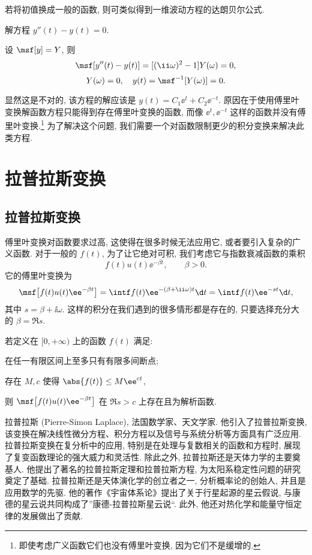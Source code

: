 若将初值换成一般的函数, 则可类似得到一维波动方程的达朗贝尔公式.

\begin{example}
  \label{exam:second-ode}
  解方程 $y''(t)-y(t)=0$.
\end{example}

\begin{solution}
  设 $\msf[y]=Y$, 则
  \[
    \msf[y''(t)-y(t)]=[(\ii \omega)^2-1]Y(\omega)=0,
  \]
  \[Y(\omega)=0,\quad y(t)=\msf^{-1}[Y(\omega)]=0.\]
\end{solution}

显然这是不对的, 该方程的解应该是 $y(t)=C_1\ee^t+C_2\ee^{-t}$.
原因在于使用傅里叶变换解函数方程只能得到存在傅里叶变换的函数, 而像 $\ee^t,\ee^{-t}$ 这样的函数并没有傅里叶变换.\footnote{
  即使考虑广义函数它们也没有傅里叶变换, 因为它们不是缓增的.
}
为了解决这个问题, 我们需要一个对函数限制更少的积分变换来解决此类方程.



\section{拉普拉斯变换}

\subsection{拉普拉斯变换}

傅里叶变换对函数要求过高, 这使得在很多时候无法应用它, 或者要引入复杂的广义函数.
对于一般的 $f(t)$, 为了让它绝对可积, 我们考虑它与指数衰减函数的乘积
\[
  f(t)u(t)\ee^{-\beta t},\qquad\beta>0.
\]
它的傅里叶变换为
\[
   \msf\bigl[f(t)u(t)\ee^{-\beta t}\bigr]
  =\intf f(t)\ee^{-(\beta+\ii \omega)t}\d t
  =\intf f(t)\ee^{-st}\d t,
\]
其中 $s=\beta+\ii \omega$.
这样的积分在我们遇到的很多情形都是存在的, 只要选择充分大的 $\beta=\Re s$.

\begin{theorem}[拉普拉斯变换存在定理]
  若定义在 $[0,+\infty)$ 上的函数 $f(t)$ 满足:
  \begin{enuma}[labelindent=.5em]
    \item 在任一有限区间上至多只有有限多间断点;
    \item 存在 $M,c$ 使得 $\abs{f(t)}\le M\ee^{ct}$,
  \end{enuma}
  则 $\msf\bigl[f(t)u(t)\ee^{-\beta t}\bigr]$ 在 $\Re s>c$ 上存在且为解析函数.
\end{theorem}

\begin{people}
  拉普拉斯 (Pierre-Simon Laplace), 法国数学家、天文学家.
  他引入了拉普拉斯变换, 该变换在解决线性微分方程、积分方程以及信号与系统分析等方面具有广泛应用.
  拉普拉斯变换在复分析中的应用, 特别是在处理与复数相关的函数和方程时, 展现了复变函数理论的强大威力和灵活性.
  除此之外, 拉普拉斯还是天体力学的主要奠基人. 他提出了著名的拉普拉斯定理和拉普拉斯方程, 为太阳系稳定性问题的研究奠定了基础.
  拉普拉斯还是天体演化学的创立者之一, 分析概率论的创始人, 并且是应用数学的先驱. 他的著作《宇宙体系论》提出了关于行星起源的星云假说, 与康德的星云说共同构成了''康德-拉普拉斯星云说``. 此外, 他还对热化学和能量守恒定律的发展做出了贡献.
\end{people}

